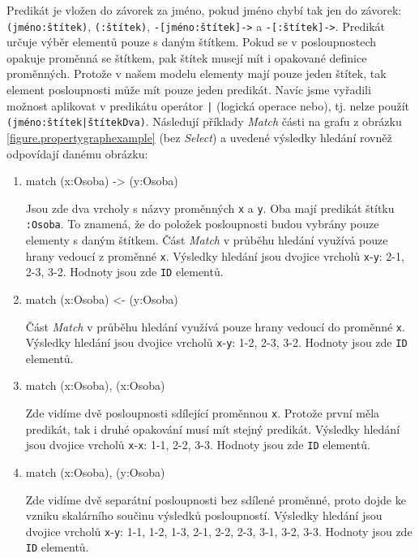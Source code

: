 Predikát je vložen do závorek za jméno, pokud jméno chybí tak jen do závorek: \texttt{(jméno:štítek)}, \texttt{(:štítek)}, \texttt{-[jméno:štítek]->} a \texttt{-[:štítek]->}.
Predikát určuje výběr elementů pouze s daným štítkem.
Pokud se v posloupnostech opakuje proměnná se štítkem, pak štítek musejí mít i opakované definice proměnných.
Protože v našem modelu elementy mají pouze jeden štítek, tak element posloupnosti může mít pouze jeden predikát.
Navíc jsme vyřadili možnost aplikovat v predikátu operátor \texttt{|} (logická operace nebo), tj. nelze použít \texttt{(jméno:štítek|štítekDva)}.
Následují příklady \textit{Match} části na grafu z obrázku \ref{figure.propertygraphexample} (bez \textit{Select}) a uvedené výsledky hledání rovněž odpovídají danému obrázku:

\begin{enumerate}
\item
\begin{code}
match (x:Osoba) -> (y:Osoba)
\end{code}
Jsou zde dva vrcholy s názvy proměnných \texttt{x} a \texttt{y}.
Oba mají predikát štítku \texttt{:Osoba}.
To znamená, že do položek posloupnosti budou vybrány pouze elementy s daným štítkem.
Část \textit{Match} v průběhu hledání využívá pouze hrany vedoucí z proměnné \texttt{x}.
Výsledky hledání jsou dvojice vrcholů \texttt{x}-\texttt{y}: 2-1, 2-3, 3-2.
Hodnoty jsou zde \texttt{ID} elementů.

\item
\begin{code}
match (x:Osoba) <- (y:Osoba)
\end{code}
Část \textit{Match} v průběhu hledání využívá pouze hrany vedoucí do proměnné \texttt{x}.
Výsledky hledání jsou dvojice vrcholů \texttt{x}-\texttt{y}: 1-2, 2-3, 3-2.
Hodnoty jsou zde \texttt{ID} elementů.

\item
\begin{code}
match (x:Osoba), (x:Osoba) 
\end{code}
Zde vidíme dvě posloupnosti sdílející proměnnou \texttt{x}.
Protože první měla predikát, tak i druhé opakování musí mít stejný predikát.
Výsledky hledání jsou dvojice vrcholů \texttt{x}-\texttt{x}: 1-1, 2-2, 3-3.
Hodnoty jsou zde \texttt{ID} elementů.

\item
\begin{code}
match (x:Osoba), (y:Osoba) 
\end{code}
Zde vidíme dvě separátní posloupnosti bez sdílené proměnné, proto dojde ke vzniku skalárního součinu výsledků posloupností.
Výsledky hledání jsou dvojice vrcholů \texttt{x}-\texttt{y}: 1-1, 1-2, 1-3, 2-1, 2-2, 2-3, 3-1, 3-2, 3-3.
Hodnoty jsou zde \texttt{ID} elementů.

\end{enumerate}


